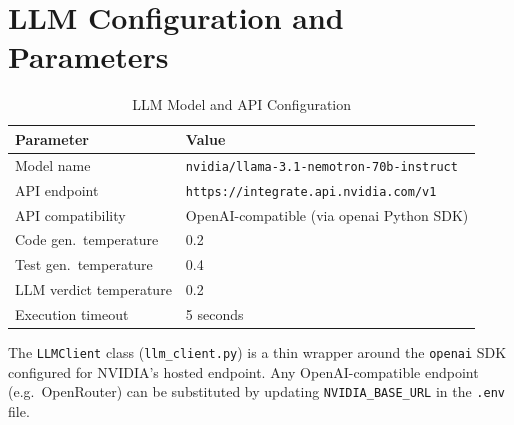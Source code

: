 \documentclass[12pt, a4paper]{article}
\begin{document}
\clearpage
\section{LLM Configuration and Parameters}
\label{sec:llm}

\begin{table}[H]
\centering
\caption{LLM Model and API Configuration}
\begin{tabularx}{0.88\linewidth}{lX}
\toprule
\rowcolor{AccentA!10}
\textbf{Parameter} & \textbf{Value} \\
\midrule
Model name               & \texttt{nvidia/llama-3.1-nemotron-70b-instruct} \\
API endpoint             & \texttt{https://integrate.api.nvidia.com/v1}    \\
API compatibility        & OpenAI-compatible (via openai Python SDK) \\
Code gen.\ temperature   & 0.2 \\
Test gen.\ temperature   & 0.4 \\
LLM verdict temperature  & 0.2 \\
Execution timeout        & 5 seconds \\
\bottomrule
\end{tabularx}
\label{tab:llm}
\end{table}

The \texttt{LLMClient} class (\texttt{llm\_client.py}) is a thin wrapper around
the \texttt{openai} SDK configured for NVIDIA's hosted endpoint. Any
OpenAI-compatible endpoint (e.g.\ OpenRouter) can be substituted by updating
\texttt{NVIDIA\_BASE\_URL} in the \texttt{.env} file.



\end{document}
